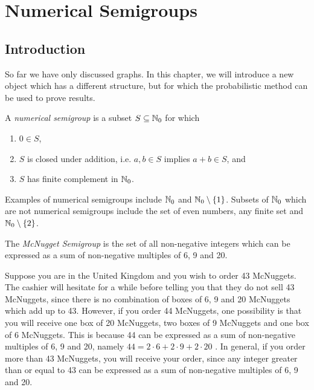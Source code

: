 \chapter{Numerical Semigroups}\label{chap:smgs}

\section{Introduction}\label{sec:smgps:intro}

So far we have only discussed graphs. In this chapter, we will introduce a new object which has a different structure, but for which the probabilistic method can be used to prove results. \par

\begin{definition} \cite{rosales2009numerical}
    A \textit{numerical semigroup} is a subset $S \subseteq \mathbb{N}_{0}$ for which 
    \begin{enumerate}
        \item $0 \in S$,
        \item $S$ is closed under addition, i.e. $a, b \in S$ implies $a + b \in S$, and
        \item $S$ has finite complement in $\mathbb{N}_{0}$.
    \end{enumerate}
\end{definition}

Examples of numerical semigroups include $\mathbb{N}_{0}$ and $\mathbb{N}_{0} \setminus \{1\}$. Subsets of $\mathbb{N}_0$ which are not numerical semigroups include the set of even numbers, any finite set and $\mathbb{N}_0 \setminus \{2\}$. \par

\begin{example}\label{ex:smgps:mcnugget}
    The \textit{McNugget Semigroup} is the set of all non-negative integers which can be expressed as a sum of non-negative multiples of 6, 9 and 20. 
\end{example}

Suppose you are in the United Kingdom and you wish to order 43 McNuggets. The cashier will hesitate for a while before telling you that they do not sell 43 McNuggets, since there is no combination of boxes of 6, 9 and 20 McNuggets which add up to 43. However, if you order 44 McNuggets, one possibility is that you will receive one box of 20 McNuggets, two boxes of 9 McNuggets and one box of 6 McNuggets. This is because 44 can be expressed as a sum of non-negative multiples of 6, 9 and 20, namely $44 = 2 \cdot 6 + 2 \cdot 9 + 2 \cdot 20$ \cite{youtube}. In general, if you order more than 43 McNuggets, you will receive your order, since any integer greater than or equal to 43 can be expressed as a sum of non-negative multiples of 6, 9 and 20. \par

